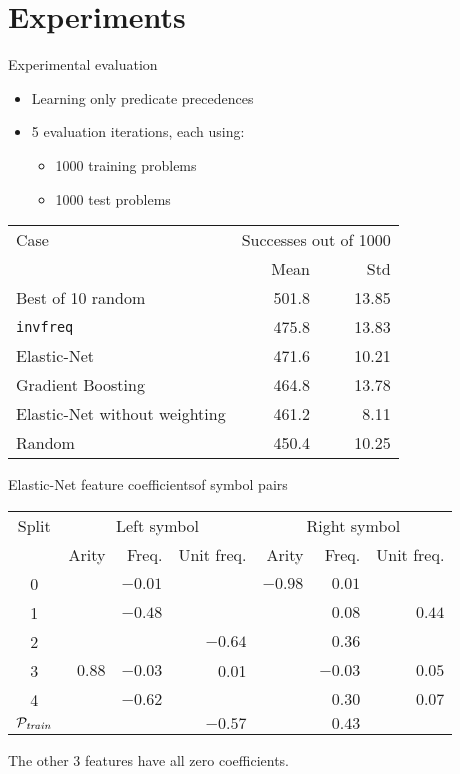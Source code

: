 \documentclass[notes]{beamer}
\begin{document}
\section{Experiments}

\begin{frame}{Experimental evaluation}

\begin{itemize}
	\item Learning only predicate precedences
	\item 5 evaluation iterations, each using:
	\begin{itemize}
		\item 1000 training problems
		\item 1000 test problems
	\end{itemize}
\end{itemize}

\begin{table}
\begin{tabular}{l|rr}
	Case & \multicolumn{2}{c}{Successes out of 1000} \\
	& Mean & Std \\
	\hline
	Best of 10 random & 501.8 & 13.85 \\
	\texttt{invfreq} & 475.8 & 13.83 \\
	Elastic-Net & 471.6 & 10.21 \\
	Gradient Boosting & 464.8 & 13.78 \\
	Elastic-Net without weighting & 461.2 & 8.11 \\
	Random & 450.4 & 10.25 \\
\end{tabular}
\end{table}
\end{frame}

\begin{frame}{Elastic-Net feature coefficients}{of symbol pairs}
\begin{table}
\begin{tabular}{c|rrr|rrr}
	Split & \multicolumn{3}{c}{Left symbol} & \multicolumn{3}{c}{Right symbol} \\
	& Arity & Freq. & Unit freq. & Arity & Freq. & Unit freq. \\
	\hline
	0 &     &$-0.01$&     &$-0.98$&$ 0.01$&      \\
	1 &     &$-0.48$&     &     &$ 0.08$&$ 0.44 $\\
	2 &     &     &$-0.64$&     &$ 0.36$&      \\
	3 &$ 0.88$&$-0.03$& 0.01&     &$-0.03$&$ 0.05 $\\
	4 &     &$-0.62$&     &     &$ 0.30$&$ 0.07 $\\
	\hline
	\(\mathcal{P}_{\mathit{train}}\) &     &     &$-0.57$&     &$ 0.43$&      \\
\end{tabular}
\end{table}

The other 3 features have all zero coefficients.
\end{frame}
\end{document}
